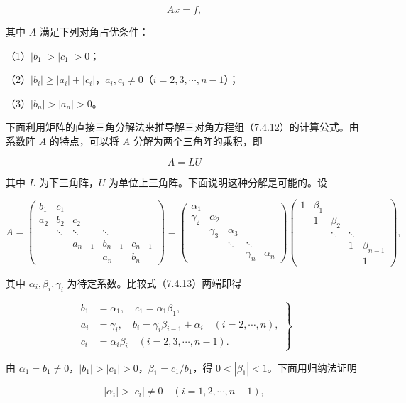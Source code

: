 \documentclass[
  10pt,
  fontset=fandol]{ctexart}
\begin{document}
\[
Ax=f,
\tag{7.4.12}
\]

其中 \(A\) 满足下列对角占优条件：

（1）\(|b_1|>|c_1|>0\)；

（2）\(|b_i|\geqslant|a_i|+|c_i|\)，\(a_i,c_i\neq0\)（\(i=2,3,\cdots,n-1\)）；

（3）\(|b_n|>|a_n|>0\)。

下面利用矩阵的直接三角分解法来推导解三对角方程组（7.4.12）的计算公式。由系数阵
\(A\) 的特点，可以将 \(A\) 分解为两个三角阵的乘积，即

\[
A=LU
\]

其中 \(L\) 为下三角阵，\(U\)
为单位上三角阵。下面说明这种分解是可能的。设

\[
A=\begin{pmatrix}
b_1&c_1&&&\\
a_2&b_2&c_2&&\\
&\ddots&\ddots&\ddots&\\
&&a_{n-1}&b_{n-1}&c_{n-1}\\
&&&a_n&b_n
\end{pmatrix}
=\begin{pmatrix}
\alpha_1&&&&\\
\gamma_2&\alpha_2&&&\\
&\gamma_3&\alpha_3&&\\
&&\ddots&\ddots&\\
&&&\gamma_n&\alpha_n
\end{pmatrix}
\begin{pmatrix}
1&\beta_1&&&\\
&1&\beta_2&&\\
&&\ddots&\ddots&\\
&&&1&\beta_{n-1}\\
&&&&1
\end{pmatrix},
\tag{7.4.13}
\]

其中 \(\alpha_i,\beta_i,\gamma_i\) 为待定系数。比较式（7.4.13）两端即得

\[
\left.\begin{aligned}
b_1&=\alpha_1,\quad c_1=\alpha_1\beta_1,\\
a_i&=\gamma_i,\quad b_i=\gamma_i\beta_{i-1}+\alpha_i\quad(i=2,\cdots,n),\\
c_i&=\alpha_i\beta_i\quad(i=2,3,\cdots,n-1).
\end{aligned}\right\}
\tag{7.4.14}
\]

由 \(\alpha_1=b_1\neq0\)，\(|b_1|>|c_1|>0\)，\(\beta_1=c_1/b_1\)，得
\(0<|\beta_1|<1\)。下面用归纳法证明

\[
|\alpha_i|>|c_i|\neq0\quad(i=1,2,\cdots,n-1),
\tag{7.4.15}
\]
\end{document}
